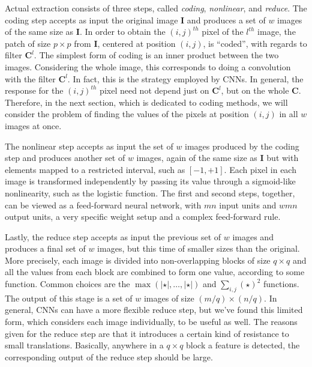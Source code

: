 \documentclass[runningheads,a4paper]{llncs}
\newcommand{\hctimes}[2]{{#1}\!\times\!{#2}}
\begin{document}
Actual extraction consists of three steps, called \emph{coding}, \emph{nonlinear}, and \emph{reduce}. The coding step accepts as input the original image $\textbf{I}$ and produces a set of $w$ images of the same size as $\textbf{I}$. In order to obtain the $(i,j)^{th}$ pixel of the $l^{th}$ image, the patch of size $\hctimes{p}{p}$ from $\textbf{I}$, centered at position $(i,j)$, is ``coded'', with regards to filter $\textbf{C}^l$. The simplest form of coding is an inner product between the two images. Considering the whole image, this corresponds to doing a convolution with the filter $\textbf{C}^l$. In fact, this is the strategy employed by CNNs. In general, the response for the $(i,j)^{th}$ pixel need not depend just on $\textbf{C}^l$, but on the whole $\textbf{C}$. Therefore, in the next section, which is dedicated to coding methods, we will consider the problem of finding the values of the pixels at position $(i,j)$ in all $w$ images at once.

The nonlinear step accepts as input the set of $w$ images produced by the coding step and produces another set of $w$ images, again of the same size as $\textbf{I}$ but with elements mapped to a restricted interval, such as $[-1,+1]$. Each pixel in each image is transformed independently by passing its value through a sigmoid-like nonlinearity, such as the logistic function. The first and second steps, together, can be viewed as a feed-forward neural network, with $mn$ input units and $wmn$ output units, a very specific weight setup and a complex feed-forward rule.

Lastly, the reduce step accepts as input the previous set of $w$ images and produces a final set of $w$ images, but this time of smaller sizes than the original. More precisely, each image is divided into non-overlapping blocks of size $\hctimes{q}{q}$ and all the values from each block are combined to form one value, according to some function. Common choices are the $\max(\left|\star\right|,\dots,\left|\star\right|)$ and $\sum_{i,j}{(\star)^2}$ functions. The output of this stage is a set of $w$ images of size $\hctimes{(m / q)}{(n / q)}$. In general, CNNs can have a more flexible reduce step, but we've found this limited form, which considers each image individually, to be useful as well. The reasons given for the reduce step are that it introduces a certain kind of resistance to small translations. Basically, anywhere in a $\hctimes{q}{q}$ block a feature is detected, the corresponding output of the reduce step should be large.
\end{document}
